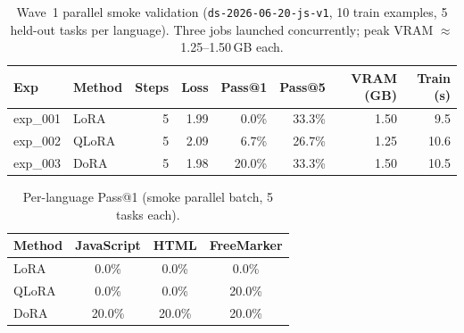 
\begin{table}[h]
\centering
\caption{Wave~1 parallel smoke validation (\texttt{ds-2026-06-20-js-v1}, 10 train examples,
5 held-out tasks per language). Three jobs launched concurrently; peak VRAM $\approx$1.25--1.50\,GB each.}
\label{tab:wave1-smoke}
\small
\begin{tabular}{llrrrrrr}
\toprule
Exp & Method & Steps & Loss & Pass@1 & Pass@5 & VRAM (GB) & Train (s) \\
\midrule
exp\_001 & LoRA & 5 & 1.99 & 0.0\% & 33.3\% & 1.50 & 9.5 \\
exp\_002 & QLoRA & 5 & 2.09 & 6.7\% & 26.7\% & 1.25 & 10.6 \\
exp\_003 & DoRA & 5 & 1.98 & 20.0\% & 33.3\% & 1.50 & 10.5 \\
\bottomrule
\end{tabular}
\end{table}

\begin{table}[h]
\centering
\caption{Per-language Pass@1 (smoke parallel batch, 5 tasks each).}
\label{tab:wave1-smoke-pass1}
\small
\begin{tabular}{lccc}
\toprule
Method & JavaScript & HTML & FreeMarker \\
\midrule
LoRA & 0.0\% & 0.0\% & 0.0\% \\
QLoRA & 0.0\% & 0.0\% & 20.0\% \\
DoRA & 20.0\% & 20.0\% & 20.0\% \\
\bottomrule
\end{tabular}
\end{table}
